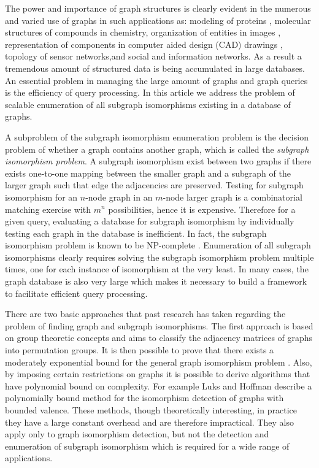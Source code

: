 The power and importance of graph structures is clearly evident in the numerous and varied use of graphs in such applications as: modeling of proteins
\cite{chi_muntz_nijssen2005}, molecular structures of compounds in chemistry\cite{willet_barnard_john1998}\cite{agrafiotis2007}, organization of entities 
in images\cite{petrakis_faloutsos1997} \cite{burge_kropatsch1999}, representation of components in computer aided design (CAD) drawings \cite{cordella2000}, 
topology of sensor networks\cite{li_wan_wang2003},and social and information networks\cite{cai_he_yan2005}. As a result a tremendous amount of structured 
data is being accumulated in large databases. An essential problem in managing the large amount of graphs and graph queries is the efficiency of query 
processing. In this article we address the problem of scalable enumeration of all subgraph isomorphisms existing in a database of graphs.

A subproblem of the subgraph isomorphism enumeration problem is the decision problem of whether a graph contains another graph, which is called the 
\textit{subgraph isomorphism problem}. A subgraph isomorphism exist between two graphs if there exists one-to-one mapping between the smaller graph 
and a subgraph of the larger graph such that edge the adjacencies are preserved. 
Testing for subgraph isomorphism for an $n$-node graph in an $m$-node larger graph is a combinatorial matching exercise with $m^n$ possibilities, hence it is 
expensive. Therefore for a given query, evaluating a database for subgraph isomorphism by individually testing each graph in the database is 
inefficient. In fact, the subgraph isomorphism problem is known to be NP-complete \cite{cook1971_np}. Enumeration of all subgraph isomorphisms clearly requires 
solving the subgraph isomorphism problem multiple times, one for each instance of isomorphism at the very least. In many cases, the graph database is also very 
large which makes it necessary to build a framework to facilitate efficient query processing.

There are two basic approaches that past research has taken regarding the problem of finding graph and subgraph isomorphisms. The first approach is based on 
group theoretic concepts and aims to classify the adjacency matrices of graphs into permutation groups. It is then possible to prove that there exists 
a moderately exponential bound for the general graph isomorphism problem \cite{babai1981}. Also, by imposing certain restrictions on graphs it is possible to 
derive algorithms that have polynomial bound on complexity. For example  Luks and Hoffman\cite{hoffmann1982} describe a polynomially bound method for the 
isomorphism detection of graphs with bounded valence. These methods, though theoretically interesting, in practice they have a large constant overhead and 
are therefore impractical. They also apply only to graph isomorphism detection, but not the detection and enumeration of subgraph isomorphism which is 
required for a wide range of applications.

